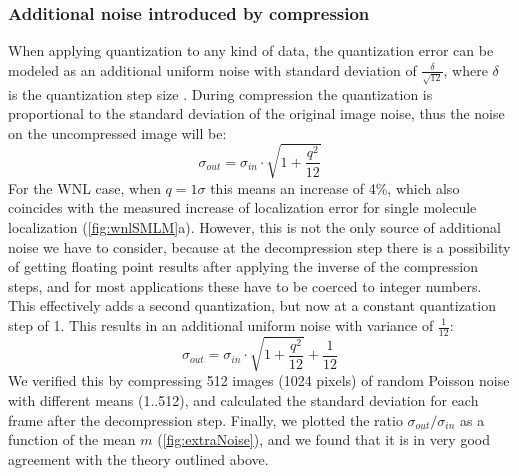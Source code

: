     \subsubsection{Additional noise introduced by compression}
    \label{sec:extraNoise}

    When applying quantization to any kind of data, the quantization error can be modeled as an additional uniform noise with standard deviation of $\frac{\delta}{\sqrt{12}}$, where $\delta$ is the quantization step size \cite{gray_quantization_1998}. During compression the quantization is proportional to the standard deviation of the original image noise, thus the noise on the uncompressed image will be:
    \begin{equation}
      \sigma_{out} = \sigma_{in} \cdot \sqrt{1+ \frac{q^2}{12}}
    \end{equation}
    For the WNL case, when $q = 1 \sigma$ this means an increase of 4\%, which also coincides with the measured increase of localization error for single molecule localization (\autoref{fig:wnlSMLM}a). However, this is not the only source of additional noise we have to consider, because at the decompression step there is a possibility of getting floating point results after applying the inverse of the compression steps, and for most applications these have to be coerced to integer numbers. This effectively adds a second quantization, but now at a constant quantization step of 1. This results in an additional uniform noise with variance of $\frac{1}{12}$:
    \begin{equation}
      \sigma_{out} = \sigma_{in} \cdot \sqrt{1+ \frac{q^2}{12}} + \frac{1}{12}
      \label{eq:extraNoise}
    \end{equation}
    We verified this by compressing 512 images (1024 pixels) of random Poisson noise with different means (1..512), and calculated the standard deviation for each frame after the decompression step. Finally, we plotted the ratio $\sigma_{out}/\sigma_{in}$ as a function of the mean $m$ (\autoref{fig:extraNoise}), and we found that it is in very good agreement with the theory outlined above.

    

    

